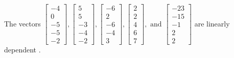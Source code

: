 \begin{exercise}
\begin{exerciseStatement}
  \end{exerciseStatement}
  \begin{exerciseAnswer}
   The vectors \(\left[\begin{array}{r}
-4 \\
0 \\
-5 \\
-5 \\
-2
\end{array}\right] , \left[\begin{array}{r}
5 \\
5 \\
-3 \\
-4 \\
-2
\end{array}\right] , \left[\begin{array}{r}
-6 \\
2 \\
-6 \\
-4 \\
3
\end{array}\right] , \left[\begin{array}{r}
2 \\
2 \\
4 \\
6 \\
7
\end{array}\right] , \text{ and } \left[\begin{array}{r}
-23 \\
-15 \\
-1 \\
2 \\
2
\end{array}\right]\) are 
  	 linearly dependent  .
  


  \end{exerciseAnswer}
\end{exercise}